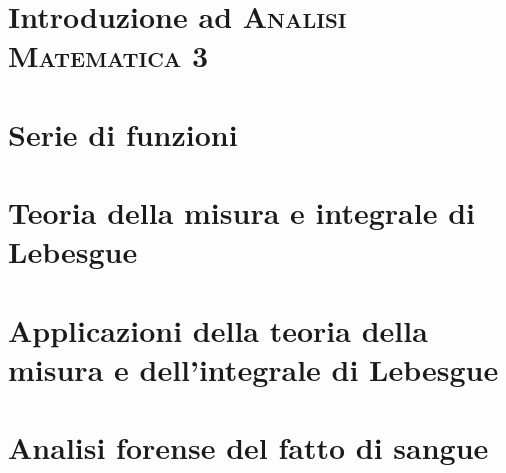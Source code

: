 \documentclass[a4paper, 11pt, twoside, openright, italian]{memoir}
\begin{document}
\frontmatter




\mainmatter

\part{Introduzione ad \textsc{Analisi Matematica 3}}

\part{Serie di funzioni}



\part{Teoria della misura e integrale di Lebesgue}


\part{Applicazioni della teoria della misura e dell'integrale di Lebesgue}



\appendix
\part{Analisi forense del fatto di sangue}


%


\backmatter

\end{document}
